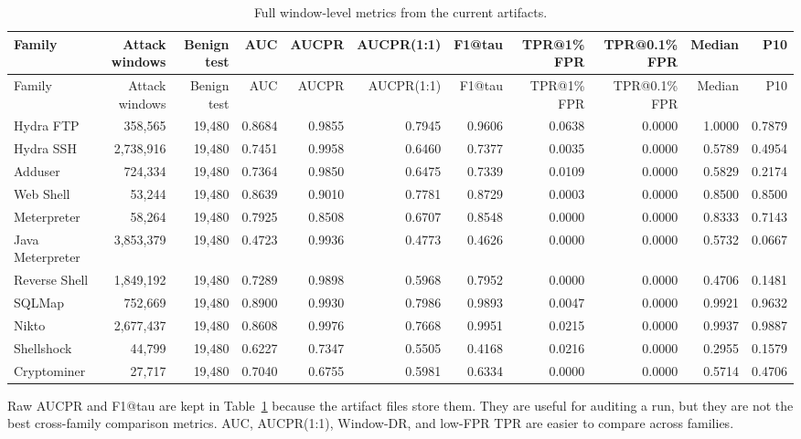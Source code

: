 \documentclass[11pt,a4paper]{article}
\begin{document}
\begin{landscape}
\scriptsize
\setlength{\tabcolsep}{3pt}
\begin{longtable}{@{}lrrrrrrrrrr@{}}
\caption{Full window-level metrics from the current artifacts.}
\label{tab:full-metrics}\\
\toprule
Family & Attack windows & Benign test & AUC & AUCPR & AUCPR(1:1) & F1@tau & TPR@1\% FPR & TPR@0.1\% FPR & Median & P10 \\
\midrule
\endfirsthead
\toprule
Family & Attack windows & Benign test & AUC & AUCPR & AUCPR(1:1) & F1@tau & TPR@1\% FPR & TPR@0.1\% FPR & Median & P10 \\
\midrule
\endhead
Hydra FTP & 358,565 & 19,480 & 0.8684 & 0.9855 & 0.7945 & 0.9606 & 0.0638 & 0.0000 & 1.0000 & 0.7879 \\
Hydra SSH & 2,738,916 & 19,480 & 0.7451 & 0.9958 & 0.6460 & 0.7377 & 0.0035 & 0.0000 & 0.5789 & 0.4954 \\
Adduser & 724,334 & 19,480 & 0.7364 & 0.9850 & 0.6475 & 0.7339 & 0.0109 & 0.0000 & 0.5829 & 0.2174 \\
Web Shell & 53,244 & 19,480 & 0.8639 & 0.9010 & 0.7781 & 0.8729 & 0.0003 & 0.0000 & 0.8500 & 0.8500 \\
Meterpreter & 58,264 & 19,480 & 0.7925 & 0.8508 & 0.6707 & 0.8548 & 0.0000 & 0.0000 & 0.8333 & 0.7143 \\
Java Meterpreter & 3,853,379 & 19,480 & 0.4723 & 0.9936 & 0.4773 & 0.4626 & 0.0000 & 0.0000 & 0.5732 & 0.0667 \\
Reverse Shell & 1,849,192 & 19,480 & 0.7289 & 0.9898 & 0.5968 & 0.7952 & 0.0000 & 0.0000 & 0.4706 & 0.1481 \\
SQLMap & 752,669 & 19,480 & 0.8900 & 0.9930 & 0.7986 & 0.9893 & 0.0047 & 0.0000 & 0.9921 & 0.9632 \\
Nikto & 2,677,437 & 19,480 & 0.8608 & 0.9976 & 0.7668 & 0.9951 & 0.0215 & 0.0000 & 0.9937 & 0.9887 \\
Shellshock & 44,799 & 19,480 & 0.6227 & 0.7347 & 0.5505 & 0.4168 & 0.0216 & 0.0000 & 0.2955 & 0.1579 \\
Cryptominer & 27,717 & 19,480 & 0.7040 & 0.6755 & 0.5981 & 0.6334 & 0.0000 & 0.0000 & 0.5714 & 0.4706 \\
\bottomrule
\end{longtable}
\normalsize
\end{landscape}

Raw AUCPR and F1@tau are kept in Table~\ref{tab:full-metrics} because the artifact files store them. They are useful for auditing a run, but they are not the best cross-family comparison metrics. AUC, AUCPR(1:1), Window-DR, and low-FPR TPR are easier to compare across families.
\end{document}
